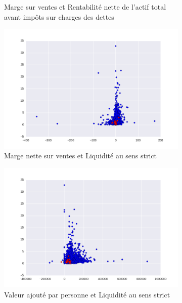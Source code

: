 \documentclass[DIV=calc, paper=a4, fontsize=11pt, twocolumn]{scrartcl}
\begin{document}
\begin{appendices}
\begin{figure}
\begin{subfigure}{.45\textwidth}
    \caption{Marge  sur ventes et Rentabilité nette de l’actif total avant impôts sur charges des dettes}
  \end{subfigure}
  \begin{subfigure}{.45\textwidth}
    \centering
    \includegraphics[width=\linewidth]{cr2xr14.png}
    \caption{Marge nette sur ventes et Liquidité au sens strict}
  \end{subfigure}
  \begin{subfigure}{.45\textwidth}
    \centering
    \includegraphics[width=\linewidth]{cr4xr14.png}
    \caption{Valeur ajouté par personne et Liquidité au sens strict}
  \end{subfigure}
  \begin{subfigure}{.45\textwidth}
    \centering

\end{subfigure}
\end{figure}
\end{appendices}
\end{document}
